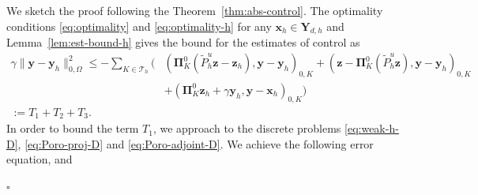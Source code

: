 \documentclass[smallextended]{svjour3}
\renewenvironment{proof}{\noindent{\it Proof.}}{\hfill$\square$}
\numberwithin{equation}{section}
\numberwithin{figure}{section}
\numberwithin{table}{section}
\newcommand\bV{\mathbf{V}}
\newcommand\bPi{\boldsymbol{\Pi}}
\newcommand{\tP}{\tilde{P}}
\newcommand\bx{\boldsymbol{x}}
\newcommand\by{\boldsymbol{y}}
\newcommand\bu{\boldsymbol{u}}
\newcommand\bv{\boldsymbol{v}}
\newcommand\bz{\boldsymbol{z}}
\newcommand{\bY}{\boldsymbol{Y}}
\newcommand\cT{\mathcal{T}}
\begin{document}
\begin{proof}
We sketch the proof following the Theorem~\ref{thm:abs-control}.
 The optimality conditions \eqref{eq:optimality} and \eqref{eq:optimality-h} for any $\bx_h \in \bY_{d,h}$ and Lemma~\ref{lem:est-bound-h}
    gives the bound for the estimates of control as
	\begin{equation}\label{est1-y}
	\begin{aligned} 
		\gamma \| \by - \by_h \|_{0, \Omega}^2 \le  - \sum_{K \in \cT_h}  \Big( & ( \bPi^{0}_K (\tP_h^u \bz - \bz_h ), \by - \by_h )_{0, K} + (\bz - \bPi^{0}_K (\tP_h^u \bz), \by - \by_h )_{0, K} \\
		& +  ( \bPi^{0}_K \bz_h + \gamma \by_h, \by - \bx_h )_{0, K} \Big) \\
        := T_1 +T_2+T_3. &
	\end{aligned}
\end{equation}
In order to bound the term $T_1$, we approach to the discrete problems \eqref{eq:weak-h-D}, \eqref{eq:Poro-proj-D} and \eqref{eq:Poro-adjoint-D}. We achieve the following error equation, and

\end{proof}
\end{document}

